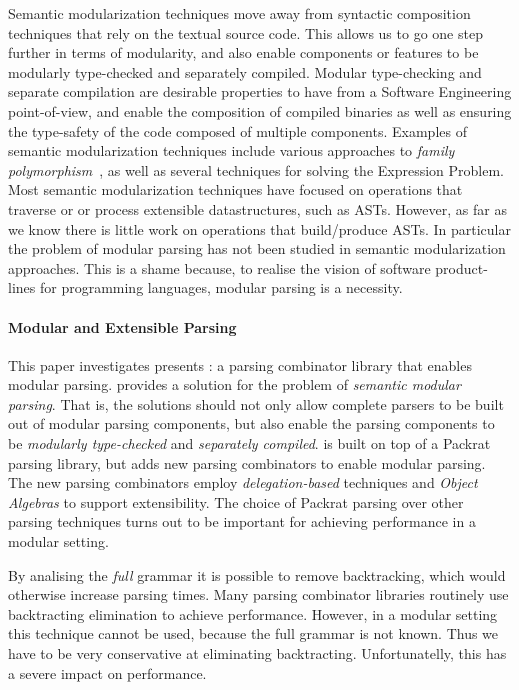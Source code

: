 Semantic modularization techniques move away
from syntactic composition techniques that rely on the textual source
code. This allows us to go one step further in terms of modularity,
and also enable components or features to be modularly type-checked
and separately compiled. Modular type-checking and separate
compilation are desirable properties to have from a Software
Engineering point-of-view, and enable the composition of compiled
binaries as well as ensuring the type-safety of the code composed of
multiple components. Examples of semantic modularization techniques 
include various approaches to \emph{family polymorphism}~\cite{}, as 
well as several techniques for solving the Expression Problem. 
 Most semantic
modularization techniques have focused on operations that traverse or 
or process extensible datastructures, such as ASTs.
 However, as far as
we know there is little work on operations that build/produce ASTs. 
In particular the problem of modular parsing has not been studied in
semantic modularization approaches. This is a shame because, to
realise the vision of software product-lines for programming
languages, modular parsing is a necessity. 

\paragraph{Modular and Extensible Parsing}
  This paper investigates presents \name: a parsing
  combinator library that enables modular parsing.
  \name provides a solution for the problem of \emph{semantic modular
    parsing}. That is, the solutions should not only
  allow complete parsers to be built out of modular parsing
  components, but also enable the parsing components to be \emph{modularly
  type-checked} and \emph{separately compiled}. \name is
  built on top of a Packrat parsing library, but adds new parsing
  combinators to enable modular parsing. The new parsing combinators 
  employ \emph{delegation-based} techniques and \emph{Object Algebras} 
  to support extensibility. The choice of Packrat parsing over other
  parsing techniques turns out to be important for achieving
  performance in a modular setting.  

  By analising the \emph{full} grammar it is possible to remove
  backtracking, which would otherwise increase parsing times. Many
  parsing combinator libraries routinely use backtracting elimination
  to achieve performance. However, in a modular setting this technique
  cannot be used, because the full grammar is not known. Thus we have
  to be very conservative at eliminating backtracting. Unfortunatelly,
  this has a severe impact on performance.

